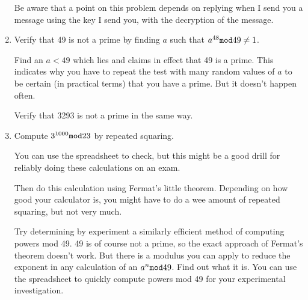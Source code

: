\documentclass[12pt]{article}
\begin{document}
\begin{enumerate}
Be aware that a point on this problem depends on replying when I send you a message using the key I send you,
with the decryption of the message.

\item  Verify that 49 is not a prime by finding $a$ such that $a^{48}{\tt mod}49 \neq 1$.

Find an $a<49$ which lies and claims in effect that 49 is a prime.  This indicates why you have to repeat the test
with many random values of $a$ to be certain (in practical terms) that you have a prime.  But it doesn't happen often.

Verify that 3293 is not a prime in the same way.

\item  Compute $3^{1000}{\tt mod}23$ by repeated squaring.

You can use the spreadsheet to check, but this might be a good drill for reliably doing these calculations on an exam.

Then do this calculation using Fermat's little theorem.  Depending on how good your calculator is, you might have to do a wee amount of repeated squaring, but not very much.

Try determining by experiment a similarly efficient method of computing powers mod 49.  49 is of course not a prime,
so the exact approach of Fermat's theorem doesn't work.  But there is a modulus you can apply to reduce the exponent in any calculation of an $a^n {\tt mod} 49$.  Find out what it is.  You can use the spreadsheet to quickly compute powers mod 49 for your experimental investigation.



\end{enumerate}
\end{document}
